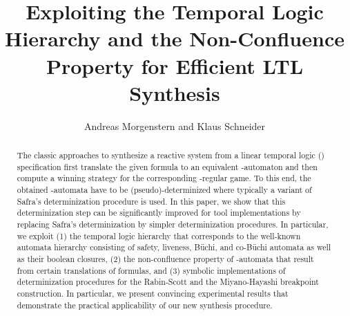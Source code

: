 \documentclass[copyright,creativecommons]{eptcs}
\begin{document}
\title{Exploiting the Temporal Logic Hierarchy and the Non-Confluence Property for Efficient LTL Synthesis}

\author{Andreas Morgenstern and Klaus Schneider
}
\def\titlerunning{Efficient  Synthesis}
\def\authorrunning{A. Morgenstern \& K. Schneider}

\newtheorem{definition}{Definition}
\newtheorem{proposition}{Proposition}
\newtheorem{lemma}{Lemma}
\newtheorem{theorem}{Theorem}
\newtheorem{corollary}{Corollary}
\newtheorem{remark}{Remark}
\newtheorem{example}{Example}
\def\qed{\hfill \rule{2mm}{2mm}}



\maketitle

\begin{abstract}
The classic approaches to synthesize a reactive system from a linear temporal logic () specification first translate the given  formula to an equivalent -automaton and then compute a winning strategy for the corresponding -regular game. To this end, the obtained -automata have to be (pseudo)-determinized where typically a variant of Safra's determinization procedure is used. In this paper, we show that this determinization step can be significantly improved for tool implementations by replacing Safra's determinization by simpler determinization procedures. In particular, we exploit (1) the temporal logic hierarchy that corresponds to the well-known automata hierarchy consisting of safety, liveness, Büchi, and co-Büchi automata as well as their boolean closures, (2) the non-confluence property of -automata that result from certain translations of  formulas, and (3) symbolic implementations of determinization procedures for the Rabin-Scott and the Miyano-Hayashi breakpoint construction. In particular, we present convincing experimental results that demonstrate the practical applicability of our new synthesis procedure.
\end{abstract}
\end{document}
